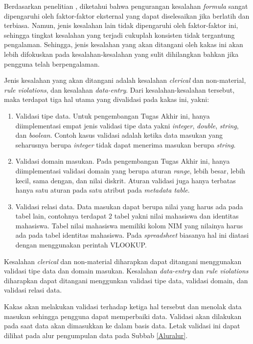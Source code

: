 Berdasarkan penelitian \citep{Howe2006}, diketahui bahwa pengurangan kesalahan \textit{formula} sangat dipengaruhi oleh faktor-faktor eksternal yang dapat diselesaikan jika berlatih dan terbiasa. Namun, jenis kesalahan lain tidak dipengaruhi oleh faktor-faktor ini, sehingga tingkat kesalahan yang terjadi cukuplah konsisten tidak tergantung pengalaman. Sehingga, jenis kesalahan yang akan ditangani oleh kakas ini akan lebih difokuskan pada kesalahan-kesalahan yang sulit dihilangkan bahkan jika pengguna telah berpengalaman.

Jenis kesalahan yang akan ditangani adalah kesalahan \textit{clerical} dan non-material, \textit{rule violations}, dan kesalahan \textit{data-entry}. Dari kesalahan-kesalahan tersebut, maka terdapat tiga hal utama yang divalidasi pada kakas ini, yakni:
\begin{enumerate}
	\item Validasi tipe data. Untuk pengembangan Tugas Akhir ini, hanya diimplementasi empat jenis validasi tipe data yakni \textit{integer}, \textit{double}, \textit{string}, dan \textit{boolean}. Contoh kasus validasi adalah ketika data masukan yang seharusnya berupa \textit{integer} tidak dapat menerima masukan berupa \textit{string}.
	\item Validasi domain masukan. Pada pengembangan Tugas Akhir ini, hanya diimplementasi validasi domain yang berupa aturan \textit{range}, lebih besar, lebih kecil, sama dengan, dan nilai diskrit. Aturan validasi juga hanya terbatas hanya satu aturan pada satu atribut pada \textit{metadata table}.
	\item Validasi relasi data. Data masukan dapat berupa nilai yang harus ada pada tabel lain, contohnya terdapat 2 tabel yakni nilai mahasiswa dan identitas mahasiswa. Tabel nilai mahasiswa memiliki kolom NIM yang nilainya harus ada pada tabel identitas mahasiswa. Pada \textit{spreadsheet} biasanya hal ini diatasi dengan menggunakan perintah VLOOKUP.
\end{enumerate}

Kesalahan \textit{clerical} dan non-material diharapkan dapat ditangani menggunakan validasi tipe data dan domain masukan. Kesalahan \textit{data-entry} dan \textit{rule violations} diharapkan dapat ditangani menggunkan validasi tipe data, validasi domain, dan validasi relasi data.

Kakas akan melakukan validasi terhadap ketiga hal tersebut dan menolak data masukan sehingga pengguna dapat memperbaiki data. Validasi akan dilakukan pada saat data akan dimasukkan ke dalam basis data. Letak validasi ini dapat dilihat pada alur pengumpulan data pada Subbab \ref{Aluralur}.

